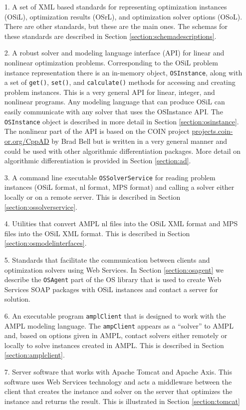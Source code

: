 \documentclass[11pt]{article}
\renewcommand{\_}{{\char"5F}}
\renewcommand{\{}{{\char"7B}}
\renewcommand{\}}{{\char"7D}}
\renewcommand{\^}{{\char"0D}}
\renewcommand{\'}{{\char"0D}}
\begin{document}
\begin{itemize}
\item[1.]  A set of XML based standards for representing optimization instances (OSiL), optimization results (OSrL), and optimization solver options (OSoL). There are other standards, but these are the main ones. The schemas for these standards are described in Section   \ref{section:schemadescriptions}.

\item[2.]  A robust solver and modeling language interface (API) for linear and nonlinear optimization problems.  Corresponding to the OSiL problem instance representation there is an in-memory object,  {\tt OSInstance}, along with a set of  {\tt get()},   {\tt set()}, and {\tt calculate()} methods for accessing and creating problem instances.  
This is a very general API for linear, integer, and nonlinear programs.  Any modeling language that can produce OSiL can easily communicate with any solver that uses the OSInstance API.   The {\tt OSInstance} object is described in more detail in Section \ref{section:osinstance}. The nonlinear part of the API is based on the COIN project \url{projects.coin-or.org/CppAD} by Brad Bell but is written in a very general manner and could be used with other algorithmic differentiation packages. More detail on algorithmic differentiation is provided in Section \ref{section:ad}.


\item[3.]  A  command line executable {\tt OSSolverService}  for reading problem instances (OSiL format, nl format, MPS format) and calling a solver either locally or on a remote server.  This is described in Section \ref{section:ossolverservice}.


\item[4.] Utilities that convert AMPL nl files into the OSiL XML format and MPS files into the OSiL XML format.  This is described in Section \ref{section:osmodelinterfaces}.


\item[5.]  Standards that facilitate the communication between clients and optimization solvers using Web Services.  In  Section \ref{section:osagent} we describe the {\tt OSAgent} part of the OS library that is used to create Web Services
 SOAP packages with OSiL instances and contact a server for solution. 

\item[6.]  An executable program {\tt amplClient} that is designed to work with the AMPL modeling language. The {\tt ampClient} appears as a ``solver'' to AMPL and, based on options given in AMPL, contact solvers either remotely or locally to solve instances created in AMPL. This is described in Section \ref{section:amplclient}.

\item[7.]  Server software that works with Apache Tomcat and Apache Axis.  
This software uses Web Services technology and acts a middleware between the client that creates the instance and solver on the server that optimizes the instance and returns the result. This is illustrated in Section  \ref{section:tomcat}
\end{itemize}
\end{document}

